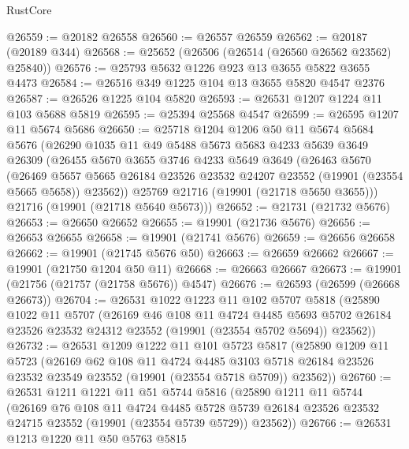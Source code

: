 \begin{lexlean}{RustCore}
\begin{coremodule}
@26559 := @20182 @26558
@26560 := @26557 @26559
@26562 := @20187 (@20189 @344)
@26568 := @25652 (@26506 (@26514 (@26560 @26562 @23562) @25840))
@26576 := @25793 @5632 @1226 @923 @13 @3655 @5822 @3655 @4473
@26584 := @26516 @349 @1225 @104 @13 @3655 @5820 @4547 @2376
@26587 := @26526 @1225 @104 @5820
@26593 := @26531 @1207 @1224 @11 @103 @5688 @5819
@26595 := @25394 @25568 @4547
@26599 := @26595 @1207 @11 @5674 @5686
@26650 := @25718
    @1204
    @1206
    @50
    @11
    @5674
    @5684
    @5676
    (@26290
      @1035
      @11
      @49
      @5488
      @5673
      @5683
      @4233
      @5639
      @3649
      @26309
      (@26455
        @5670
        @3655
        @3746
        @4233
        @5649
        @3649
        (@26463
          @5670
          (@26469
            @5657
            @5665
            @26184
            @23526
            @23532
            @24207
            @23552
            (@19901 (@23554 @5665 @5658))
            @23562))
        @25769
        @21716
        (@19901 (@21718 @5650 @3655)))
      @21716
      (@19901 (@21718 @5640 @5673)))
@26652 := @21731 (@21732 @5676)
@26653 := @26650 @26652
@26655 := @19901 (@21736 @5676)
@26656 := @26653 @26655
@26658 := @19901 (@21741 @5676)
@26659 := @26656 @26658
@26662 := @19901 (@21745 @5676 @50)
@26663 := @26659 @26662
@26667 := @19901 (@21750 @1204 @50 @11)
@26668 := @26663 @26667
@26673 := @19901 (@21756 (@21757 (@21758 @5676)) @4547)
@26676 := @26593 (@26599 (@26668 @26673))
@26704 := @26531
    @1022
    @1223
    @11
    @102
    @5707
    @5818
    (@25890
      @1022
      @11
      @5707
      (@26169
        @46
        @108
        @11
        @4724
        @4485
        @5693
        @5702
        @26184
        @23526
        @23532
        @24312
        @23552
        (@19901 (@23554 @5702 @5694))
        @23562))
@26732 := @26531
    @1209
    @1222
    @11
    @101
    @5723
    @5817
    (@25890
      @1209
      @11
      @5723
      (@26169
        @62
        @108
        @11
        @4724
        @4485
        @3103
        @5718
        @26184
        @23526
        @23532
        @23549
        @23552
        (@19901 (@23554 @5718 @5709))
        @23562))
@26760 := @26531
    @1211
    @1221
    @11
    @51
    @5744
    @5816
    (@25890
      @1211
      @11
      @5744
      (@26169
        @76
        @108
        @11
        @4724
        @4485
        @5728
        @5739
        @26184
        @23526
        @23532
        @24715
        @23552
        (@19901 (@23554 @5739 @5729))
        @23562))
@26766 := @26531 @1213 @1220 @11 @50 @5763 @5815

\end{coremodule}
\end{lexlean}
